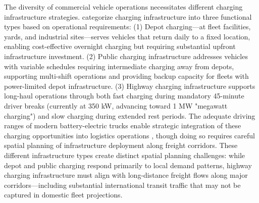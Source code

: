         The diversity of commercial vehicle operations necessitates different charging infrastructure strategies. \citet{9524919} categorize charging infrastructure into three functional types based on operational requirements: (1) Depot charging—at fleet facilities, yards, and industrial sites—serves vehicles that return daily to a fixed location, enabling cost-effective overnight charging but requiring substantial upfront infrastructure investment. (2) Public charging infrastructure addresses vehicles with variable schedules requiring intermediate charging away from depots, supporting multi-shift operations and providing backup capacity for fleets with power-limited depot infrastructure. (3) Highway charging infrastructure supports long-haul operations through both fast charging during mandatory 45-minute driver breaks (currently at 350 kW, advancing toward 1 MW "megawatt charging") and slow charging during extended rest periods. The adequate driving ranges of modern battery-electric trucks enable strategic integration of these charging opportunities into logistics operations \citep{WAN2024132361}, though doing so requires careful spatial planning of infrastructure deployment along freight corridors.
        These different infrastructure types create distinct spatial planning challenges: while depot and public charging respond primarily to local demand patterns, highway charging infrastructure must align with long-distance freight flows along major corridors—including substantial international transit traffic that may not be captured in domestic fleet projections.

        

        
        

